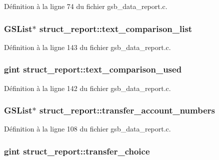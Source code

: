 Définition à la ligne 74 du fichier gsb\_\-data\_\-report.c.

\subsubsection[{text\_\-comparison\_\-list}]{\setlength{\rightskip}{0pt plus 5cm}GSList$\ast$ {\bf struct\_\-report::text\_\-comparison\_\-list}}\label{structstruct__report_a7e717b753e64b617cf3627c52dfcaec9}


Définition à la ligne 143 du fichier gsb\_\-data\_\-report.c.

\subsubsection[{text\_\-comparison\_\-used}]{\setlength{\rightskip}{0pt plus 5cm}gint {\bf struct\_\-report::text\_\-comparison\_\-used}}\label{structstruct__report_a28a9dc58363522b96365a19d4aaece25}


Définition à la ligne 142 du fichier gsb\_\-data\_\-report.c.

\subsubsection[{transfer\_\-account\_\-numbers}]{\setlength{\rightskip}{0pt plus 5cm}GSList$\ast$ {\bf struct\_\-report::transfer\_\-account\_\-numbers}}\label{structstruct__report_aa4b3e636330b92666a236d970baa08c3}


Définition à la ligne 108 du fichier gsb\_\-data\_\-report.c.

\subsubsection[{transfer\_\-choice}]{\setlength{\rightskip}{0pt plus 5cm}gint {\bf struct\_\-report::transfer\_\-choice}}\label{structstruct__report_a38325745bf7418b74f17643827acaeac}


